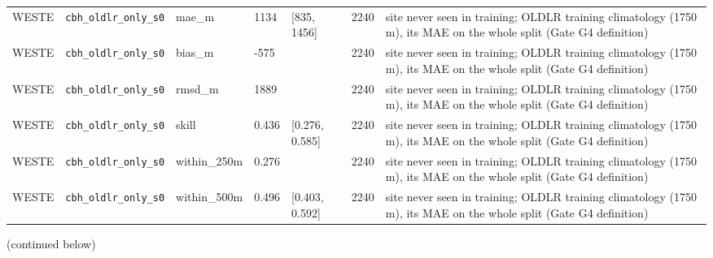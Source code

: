 \begin{center}
{\begin{tabular}{lp{2.4cm}llllp{7.3cm}}
WESTE & \texttt{cbh\_\allowbreak{}oldlr\_\allowbreak{}only\_\allowbreak{}s0} & mae\_m & 1134 & [835, 1456] & 2240 & site never seen in training; OLDLR training climatology (1750 m), its MAE on the whole split (Gate G4 definition) \\
WESTE & \texttt{cbh\_\allowbreak{}oldlr\_\allowbreak{}only\_\allowbreak{}s0} & bias\_m & -575 &  & 2240 & site never seen in training; OLDLR training climatology (1750 m), its MAE on the whole split (Gate G4 definition) \\
WESTE & \texttt{cbh\_\allowbreak{}oldlr\_\allowbreak{}only\_\allowbreak{}s0} & rmsd\_m & 1889 &  & 2240 & site never seen in training; OLDLR training climatology (1750 m), its MAE on the whole split (Gate G4 definition) \\
WESTE & \texttt{cbh\_\allowbreak{}oldlr\_\allowbreak{}only\_\allowbreak{}s0} & skill & 0.436 & [0.276, 0.585] & 2240 & site never seen in training; OLDLR training climatology (1750 m), its MAE on the whole split (Gate G4 definition) \\
WESTE & \texttt{cbh\_\allowbreak{}oldlr\_\allowbreak{}only\_\allowbreak{}s0} & within\_250m & 0.276 &  & 2240 & site never seen in training; OLDLR training climatology (1750 m), its MAE on the whole split (Gate G4 definition) \\
WESTE & \texttt{cbh\_\allowbreak{}oldlr\_\allowbreak{}only\_\allowbreak{}s0} & within\_500m & 0.496 & [0.403, 0.592] & 2240 & site never seen in training; OLDLR training climatology (1750 m), its MAE on the whole split (Gate G4 definition) \\
\bottomrule
\end{tabular}}\par\footnotesize(continued below)
\end{center}

